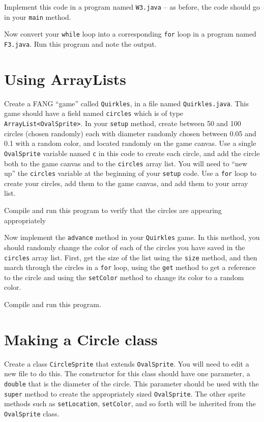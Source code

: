 \documentclass[12pt]{article}
\begin{document}
Implement this code in a program named \verb'W3.java' --
as before, the code should go in your \verb'main' method.


\noindent
Now convert your \verb'while' loop into a corresponding \verb'for' loop
in a program named \verb'F3.java'.
Run this program and note the output.


\section*{Using ArrayLists}
Create a FANG ``game'' called \verb'Quirkles',
in a file named \verb'Quirkles.java'.
This game should have a field named \verb'circles'
which is of type \verb'ArrayList<OvalSprite>'.
In your \verb'setup' method,
create between 50 and 100 circles (chosen randomly)
each with diameter randomly chosen between 0.05 and 0.1
with a random color, and located randomly on the game canvas.
Use a single \verb'OvalSprite' variable named \verb'c' in this code
to create each circle,
and add the circle both to the game canvas
and to the \verb'circles' array list.
You will need to ``new up'' the \verb'circles' variable
at the beginning of your \verb'setup' code.
Use a \verb'for' loop to create your circles,
add them to the game canvas, and add them to your array list.

Compile and run this program to verify
that the circles are appearing appropriately


\noindent
Now implement the \verb'advance' method in your \verb'Quirkles' game.
In this method,
you should randomly change the color of each of the circles
you have saved in the \verb'circles' array list.
First, get the size of the list using the \verb'size' method,
and then march through the circles in a \verb'for' loop,
using the \verb'get' method to get a reference to the circle
and using the \verb'setColor' method to change its color
to a random color.

Compile and run this program.


\section*{Making a Circle class}
Create a class \verb'CircleSprite' that extends \verb'OvalSprite'.
You will need to edit a new file to do this.
The constructor for this class should have one parameter,
a \verb'double' that is the diameter of the circle.
This parameter should be used with the \verb'super' method
to create the appropriately sized \verb'OvalSprite'.
The other sprite methods such as \verb'setLocation', \verb'setColor',
and so forth will be inherited from the \verb'OvalSprite' class.
\end{document}
